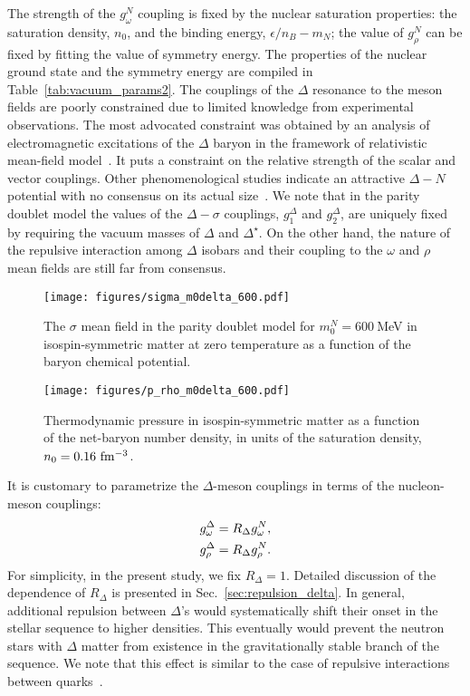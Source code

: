 \documentclass[preprint,showkeys,lengthcheck,nofootinbib,twocolumn,notitlepage,floatfix,superscriptaddress]{revtex4-1}
\begin{document}
The strength of the $g^N_\omega$ coupling is fixed by the nuclear saturation properties: the saturation density, $n_0$, and the binding energy, $\epsilon/n_B-m_N$; the value of $g^N_\rho$ can be fixed by fitting the value of symmetry energy. The properties of the nuclear ground state and the symmetry energy are compiled in Table~\ref{tab:vacuum_params2}. The couplings of the $\Delta$ resonance to the meson fields are poorly constrained due to limited knowledge from experimental observations. The most advocated constraint was obtained by an analysis of electromagnetic excitations of the $\Delta$ baryon in the framework of relativistic mean-field model~\cite{Wehrberger:1989cd}. It puts a constraint on the relative strength of the scalar and vector couplings. Other phenomenological studies indicate an attractive $\Delta-N$ potential with no consensus on its actual size~\cite{Horikawa:1980cv, OConnell:1990njm, Lehr:1999zr, Nakamura:2009iq}. We note that in the parity doublet model the values of the $\Delta-\sigma$ couplings, $g_1^\Delta$ and $g_2^\Delta$, are uniquely fixed by requiring the vacuum masses of $\Delta$ and $\Delta^\star$. On the other hand, the nature of the repulsive interaction among $\Delta$ isobars and their coupling to the $\omega$ and $\rho$ mean fields are still far from consensus. 

\begin{figure}[t!]
  \centering
  \texttt{[image: figures/sigma\_m0delta\_600.pdf]}
  \caption{The $\sigma$ mean field in the parity doublet model for $m_0^N=600~$MeV in isospin-symmetric matter at zero temperature as a function of the baryon chemical potential.}
  \label{fig:sigma_600}
\end{figure}

\begin{figure}[t!]
  \centering
  \texttt{[image: figures/p\_rho\_m0delta\_600.pdf]}
  \caption{Thermodynamic pressure in isospin-symmetric matter as a function of the net-baryon number density, in units of the saturation density, $n_0=0.16~\rm fm^{-3}$.}
  \label{fig:p_rho_600}
\end{figure}

It is customary to parametrize the $\Delta$-meson couplings in terms of the nucleon-meson couplings:
\begin{subequations}\label{eq:r_delta}
\begin{align}
    g_\omega^\Delta &= R_\Delta g_\omega^N \textrm, \\
    g_\rho^\Delta &= R_\Delta g_\rho^N \textrm.
\end{align}
\end{subequations}
For simplicity, in the present study, we fix $R_\Delta=1$. Detailed discussion of the dependence of $R_\Delta$ is presented in Sec.~\ref{sec:repulsion_delta}. In general, additional repulsion between $\Delta$'s would systematically shift their onset in the stellar sequence to higher densities. This eventually would prevent the neutron stars with $\Delta$ matter from existence in the gravitationally stable branch of the sequence. We note that this effect is similar to the case of repulsive interactions between quarks~\cite{Marczenko:2020jma}.
 
\end{document}

